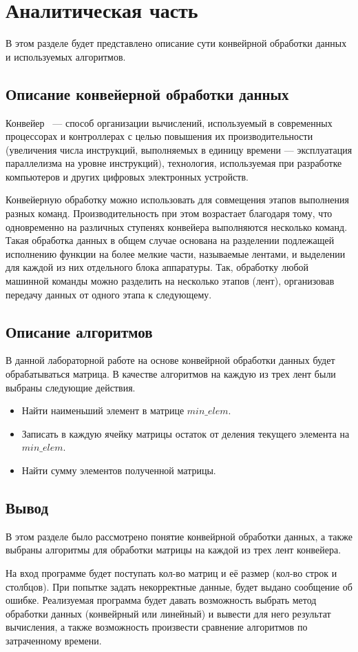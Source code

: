 \chapter{Аналитическая часть}
В этом разделе будет представлено описание сути конвейрной обработки данных и используемых алгоритмов.

\section{Описание конвейерной обработки данных}

Конвейер~\cite{bib1} — способ организации вычислений, используемый в современных процессорах и контроллерах с целью повышения их производительности (увеличения числа инструкций, выполняемых в единицу времени — эксплуатация параллелизма на уровне инструкций), технология, используемая при разработке компьютеров и других цифровых электронных устройств.

Конвейерную обработку можно использовать для совмещения этапов выполнения разных команд. Производительность при этом возрастает благодаря тому, что одновременно на различных ступенях конвейера выполняются несколько команд. Такая обработка данных в общем случае основана на разделении подлежащей исполнению функции на более мелкие части, называемые лентами, и выделении для каждой из них отдельного блока аппаратуры. Так, обработку любой машинной команды можно разделить на несколько этапов (лент), организовав передачу данных от одного этапа к следующему.

\section{Описание алгоритмов}

В данной лабораторной работе на основе конвейрной обработки данных будет обрабатываться матрица. В качестве алгоритмов на каждую из трех лент были выбраны следующие действия.

\begin{itemize}[label=---]
    \item Найти наименьший элемент в матрице $min\_elem$.
    \item Записать в каждую ячейку матрицы остаток от деления текущего элемента на $min\_elem$.
    \item Найти сумму элементов полученной матрицы.
\end{itemize}

\section*{Вывод}

В этом разделе было рассмотрено понятие конвейрной обработки данных, а также выбраны алгоритмы для обработки матрицы на каждой из трех лент конвейера.

 На вход программе будет поступать кол-во матриц и её размер (кол-во строк и столбцов). При попытке задать некорректные данные, будет выдано сообщение об ошибке. Реализуемая программа будет давать возможность выбрать метод обработки данных (конвейрный или линейный) и вывести для него результат вычисления, а также возможность произвести сравнение алгоритмов по затраченному времени.